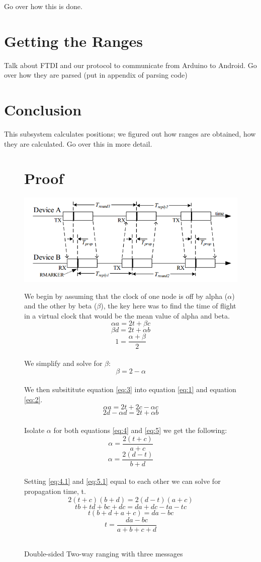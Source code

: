 Go over how this is done.

\section{Getting the Ranges}
Talk about FTDI and our protocol to communicate from Arduino to Android. Go over how they are parsed (put in appendix of parsing code)

\section{Conclusion}
This subsystem calculates positions; we figured out how ranges are obtained, how they are calculated. Go over this in more detail.

\begin{figure}
\section{Proof}
	\includegraphics[width=\linewidth]{tprop.png}
	\caption{Double-sided Two-way ranging with three messages}

We begin by assuming that the clock of one node is off by alpha ($\alpha$) and the other by beta ($\beta$), the key here was to find the time of flight in a virtual clock that would be the mean value of alpha and beta.
\\
\[ \alpha a = 2t + \beta c  \tag{1} \label{eq:1} \]
\[ \beta d = 2t + \alpha b  \tag{2} \label{eq:2} \]
\[ 1 = \frac{\alpha + \beta}{2} \]
\\
We simplify and solve for $\beta$:
\\
\[ \beta = 2 - \alpha  \tag{3} \label{eq:3} \]
\\
We then subsititute equation \eqref{eq:3} into equation \eqref{eq:1} and equation \eqref{eq:2}.
\\
\[ \alpha a = 2t + 2c - \alpha c  \tag{4} \label{eq:4} \]
\[ 2d - \alpha d = 2t + \alpha b  \tag{5} \label{eq:5} \]
\\
Isolate $\alpha$ for both equations \eqref{eq:4} and \eqref{eq:5} we get the following:
\\
\[ \alpha = \frac{2(t + c)}{a + c}  \tag{4.1} \label{eq:4.1} \]
\[ \alpha = \frac{2(d - t)}{b + d}  \tag{5.1} \label{eq:5.1} \]
\\
Setting \eqref{eq:4.1} and \eqref{eq:5.1} equal to each other we can solve for propagation time, t.
\\
\[ 2(t + c)(b +d) = 2(d - t)(a + c)\]
\[ tb + td +bc + dc = da + dc - ta - tc \]
\[ t(b + d + a + c) = da - bc\]
\[ t = \frac{da-bc}{a + b + c + d}  \tag{6} \label{eq:6} \]
\\
\end{figure}
